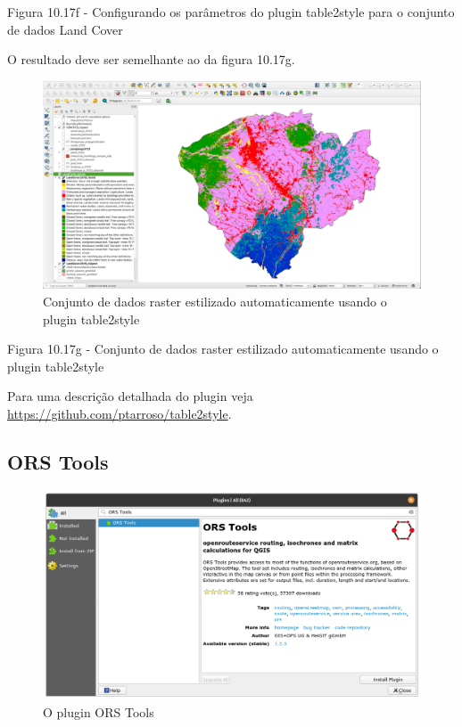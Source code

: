 \documentclass[
]{krantz}
\begin{document}
Figura 10.17f - Configurando os parâmetros do plugin table2style para o conjunto de dados Land Cover

O resultado deve ser semelhante ao da figura 10.17g.

\begin{figure}
\centering
\includegraphics{media/modulo10/fig1017_g.png}
\caption{Conjunto de dados raster estilizado automaticamente usando o plugin table2style}
\end{figure}

Figura 10.17g - Conjunto de dados raster estilizado automaticamente usando o plugin table2style

Para uma descrição detalhada do plugin veja \url{https://github.com/ptarroso/table2style}.

\hypertarget{ors-tools}{%
\subsection{ORS Tools}\label{ors-tools}}

\begin{figure}
\centering
\includegraphics{media/modulo10/fig1018_a.png}
\caption{O plugin ORS Tools}
\end{figure}
\end{document}
